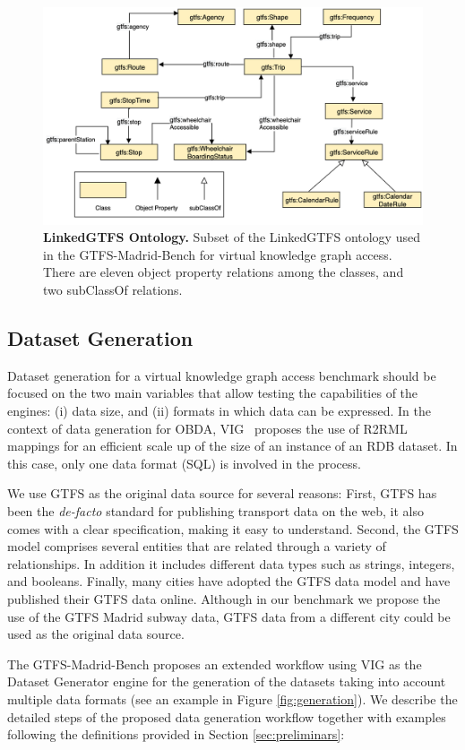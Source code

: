 \begin{figure}
    \centering
    \includegraphics[width=0.8\linewidth]{figures/GTFSontology.png}
    \caption{\textbf{LinkedGTFS Ontology.} Subset of the LinkedGTFS ontology used in the GTFS-Madrid-Bench for virtual knowledge graph access. There are eleven object property relations among the classes, and two subClassOf relations.}
    \label{fig:gtfsOntology}
\end{figure}

\subsection{Dataset Generation}

Dataset generation for a virtual knowledge graph access benchmark should be focused on the two main variables that allow testing the capabilities of the engines: (i) data size, and (ii) formats in which data can be expressed. In the context of data generation for OBDA, VIG~\citep{lantivig} proposes the use of R2RML mappings for an efficient scale up of the size of an instance of an RDB dataset. In this case, only one data format (SQL) is involved in the process. 

We use GTFS as the original data source for several reasons: First, GTFS has been the \textit{de-facto} standard for publishing transport data on the web, it also comes with a clear specification, making it easy to understand. Second, the GTFS model comprises several entities that are related through a variety of relationships. In addition it includes different data types such as strings, integers, and booleans. Finally, many cities have adopted the GTFS data model and have published their GTFS data online. Although in our benchmark we propose the use of the GTFS Madrid subway data, GTFS data from a different city could be used as the original data source.

The GTFS-Madrid-Bench proposes an extended workflow using VIG as the Dataset Generator engine for the generation of the datasets taking into account multiple data formats (see an example in Figure \ref{fig:generation}). We describe the detailed steps of the proposed data generation workflow together with examples following the definitions provided in Section \ref{sec:preliminars}:

